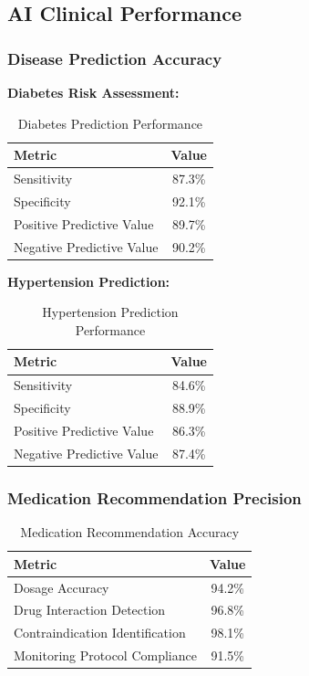\documentclass[conference]{IEEEtran}
\begin{document}
\subsection{AI Clinical Performance}

\subsubsection{Disease Prediction Accuracy}

\textbf{Diabetes Risk Assessment:}
\begin{table}[H]
\centering
\caption{Diabetes Prediction Performance}
\begin{tabular}{|l|c|}
\hline
\textbf{Metric} & \textbf{Value} \\
\hline
Sensitivity & 87.3\% \\
Specificity & 92.1\% \\
Positive Predictive Value & 89.7\% \\
Negative Predictive Value & 90.2\% \\
\hline
\end{tabular}
\end{table}

\textbf{Hypertension Prediction:}
\begin{table}[H]
\centering
\caption{Hypertension Prediction Performance}
\begin{tabular}{|l|c|}
\hline
\textbf{Metric} & \textbf{Value} \\
\hline
Sensitivity & 84.6\% \\
Specificity & 88.9\% \\
Positive Predictive Value & 86.3\% \\
Negative Predictive Value & 87.4\% \\
\hline
\end{tabular}
\end{table}

\subsubsection{Medication Recommendation Precision}
\begin{table}[H]
\centering
\caption{Medication Recommendation Accuracy}
\begin{tabular}{|l|c|}
\hline
\textbf{Metric} & \textbf{Value} \\
\hline
Dosage Accuracy & 94.2\% \\
Drug Interaction Detection & 96.8\% \\
Contraindication Identification & 98.1\% \\
Monitoring Protocol Compliance & 91.5\% \\
\hline
\end{tabular}
\end{table}
\end{document}
